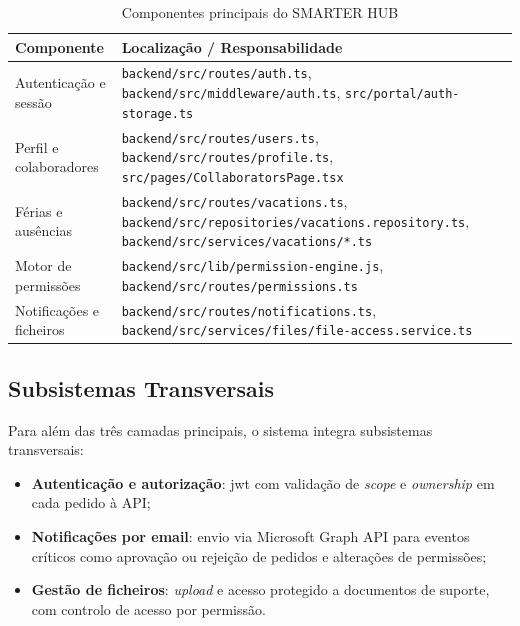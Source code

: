 \documentclass[12pt, a4paper, twoside, openright]{report}
\begin{document}
\begin{table}[H]
  \caption{Componentes principais do SMARTER HUB}
  \label{tab:componentes}
  \small\sffamily
  \begin{tabularx}{\textwidth}{|l|X|}
    \hline
    \textbf{Componente} & \textbf{Localização / Responsabilidade} \\
    \hline
    Autenticação e sessão & \texttt{backend/src/routes/auth.ts}, \texttt{backend/src/middleware/auth.ts}, 
    \texttt{src/portal/auth-storage.ts} \\
    \hline
    Perfil e colaboradores & \texttt{backend/src/routes/users.ts}, \texttt{backend/src/routes/profile.ts}, \texttt{src/pages/CollaboratorsPage.tsx} \\
    \hline
    Férias e ausências & \texttt{backend/src/routes/vacations.ts}, \newline \texttt{backend/src/repositories/vacations.repository.ts}, \newline \texttt{backend/src/services/vacations/*.ts} \\
    \hline
    Motor de permissões & \texttt{backend/src/lib/permission-engine.js}, \newline \texttt{backend/src/routes/permissions.ts} \\
    \hline
    Notificações e ficheiros & \texttt{backend/src/routes/notifications.ts}, \newline \texttt{backend/src/services/files/file-access.service.ts} \\
    \hline
  \end{tabularx}
\end{table}

\subsection{Subsistemas Transversais}

Para além das três camadas principais, o sistema integra subsistemas transversais:

\begin{itemize}
  \item \textbf{Autenticação e autorização}: \gls{jwt} com validação de \textit{scope}
        e \textit{ownership} em cada pedido à API;
  \item \textbf{Notificações por email}: envio via Microsoft Graph API para eventos
        críticos como aprovação ou rejeição de pedidos e alterações de permissões;
  \item \textbf{Gestão de ficheiros}: \textit{upload} e acesso protegido a documentos
        de suporte, com controlo de acesso por permissão.
\end{itemize}
\end{document}
